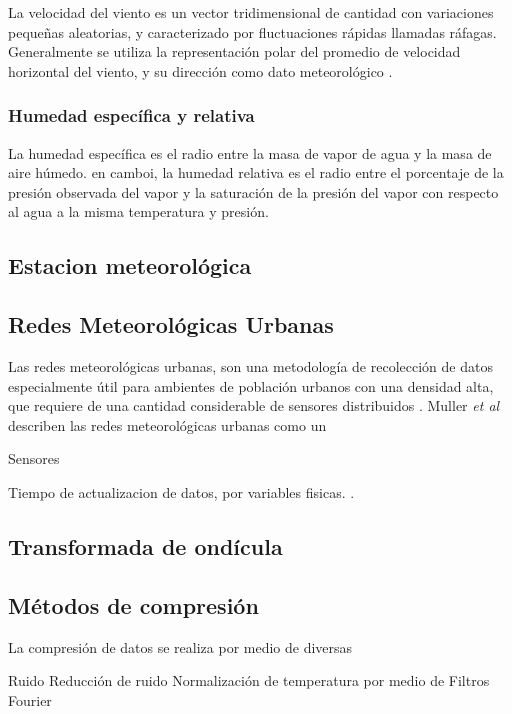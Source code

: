 La velocidad del viento es un vector tridimensional de cantidad con variaciones pequeñas aleatorias, y caracterizado por fluctuaciones rápidas llamadas ráfagas. Generalmente se utiliza la representación polar del promedio de velocidad horizontal del viento, y su dirección como dato meteorológico \cite{CIMO_2008}.

\subsubsection{Humedad específica y relativa}

La humedad específica es el radio entre la masa de vapor de agua y la masa de aire húmedo. en camboi, la humedad relativa es el radio entre el porcentaje de la presión observada del vapor y la saturación de la presión del vapor con respecto al agua a la misma temperatura y presión.

\subsection{Estacion meteorológica}

\subsection{Redes Meteorológicas Urbanas}

Las redes meteorológicas urbanas, son una metodología de recolección de datos especialmente útil para ambientes de población urbanos con una densidad alta, que requiere de una cantidad considerable de sensores distribuidos . Muller \textit{et al} \cite{doi:10.1002/joc.3678} describen las redes meteorológicas urbanas como un


Sensores

Tiempo de actualizacion de datos, por variables fisicas.
\cite{davis:6152C_6162C_SS}.

\subsection{Transformada de ondícula}



\subsection{Métodos de compresión}

La compresión de datos se realiza por medio de diversas

   Ruido
      Reducción de ruido
      Normalización de temperatura por medio de Filtros
   Fourier

